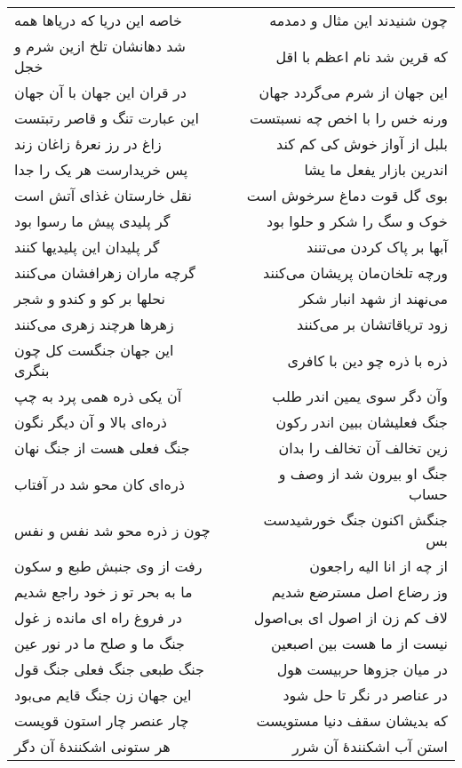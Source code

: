 \begin{center}
\begin{longtable}{l p{0.5cm} r}
\\
خاصه این دریا که دریاها همه
&&
چون شنیدند این مثال و دمدمه
\\
شد دهانشان تلخ ازین شرم و خجل
&&
که قرین شد نام اعظم با اقل
\\
در قران این جهان با آن جهان
&&
این جهان از شرم می‌گردد جهان
\\
این عبارت تنگ و قاصر رتبتست
&&
ورنه خس را با اخص چه نسبتست
\\
زاغ در رز نعرهٔ زاغان زند
&&
بلبل از آواز خوش کی کم کند
\\
پس خریدارست هر یک را جدا
&&
اندرین بازار یفعل ما یشا
\\
نقل خارستان غذای آتش است
&&
بوی گل قوت دماغ سرخوش است
\\
گر پلیدی پیش ما رسوا بود
&&
خوک و سگ را شکر و حلوا بود
\\
گر پلیدان این پلیدیها کنند
&&
آبها بر پاک کردن می‌تنند
\\
گرچه ماران زهرافشان می‌کنند
&&
ورچه تلخان‌مان پریشان می‌کنند
\\
نحلها بر کو و کندو و شجر
&&
می‌نهند از شهد انبار شکر
\\
زهرها هرچند زهری می‌کنند
&&
زود تریاقاتشان بر می‌کنند
\\
این جهان جنگست کل چون بنگری
&&
ذره با ذره چو دین با کافری
\\
آن یکی ذره همی پرد به چپ
&&
وآن دگر سوی یمین اندر طلب
\\
ذره‌ای بالا و آن دیگر نگون
&&
جنگ فعلیشان ببین اندر رکون
\\
جنگ فعلی هست از جنگ نهان
&&
زین تخالف آن تخالف را بدان
\\
ذره‌ای کان محو شد در آفتاب
&&
جنگ او بیرون شد از وصف و حساب
\\
چون ز ذره محو شد نفس و نفس
&&
جنگش اکنون جنگ خورشیدست بس
\\
رفت از وی جنبش طبع و سکون
&&
از چه از انا الیه راجعون
\\
ما به بحر تو ز خود راجع شدیم
&&
وز رضاع اصل مسترضع شدیم
\\
در فروغ راه ای مانده ز غول
&&
لاف کم زن از اصول ای بی‌اصول
\\
جنگ ما و صلح ما در نور عین
&&
نیست از ما هست بین اصبعین
\\
جنگ طبعی جنگ فعلی جنگ قول
&&
در میان جزوها حربیست هول
\\
این جهان زن جنگ قایم می‌بود
&&
در عناصر در نگر تا حل شود
\\
چار عنصر چار استون قویست
&&
که بدیشان سقف دنیا مستویست
\\
هر ستونی اشکنندهٔ آن دگر
&&
استن آب اشکنندهٔ آن شرر
\\

\end{longtable}
\end{center}
